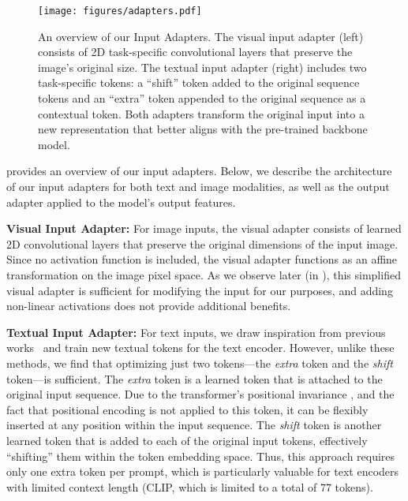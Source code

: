 \begin{figure}[t]
	\centering
	\texttt{[image: figures/adapters.pdf]}
	\caption{An overview of our Input Adapters. The visual input adapter (left) consists of 2D task-specific convolutional layers that preserve the image's original size. The textual input adapter (right) includes two task-specific tokens: a ``shift'' token added to the original sequence tokens and an ``extra'' token appended to the original sequence as a contextual token. Both adapters transform the original input into a new representation that better aligns with the pre-trained backbone model.}
	\label{fig:adapters}
\end{figure}

 provides an overview of our input adapters. Below, we describe the architecture of our input adapters for both text and image modalities, as well as the output adapter applied to the model's output features.

\textbf{Visual Input Adapter:} For image inputs, the visual adapter consists of learned 2D convolutional layers that preserve the original dimensions of the input image. Since no activation function is included, the visual adapter functions as an affine transformation on the image pixel space. As we observe later (in ), this simplified visual adapter is sufficient for modifying the input for our purposes, and adding non-linear activations does not provide additional benefits.

\textbf{Textual Input Adapter:} For text inputs, we draw inspiration from previous works~\citep{prefix_tunning,prompt_tunning,prompt_tunning2} and train new textual tokens for the text encoder. However, unlike these methods, we find that optimizing just two tokens—the \textit{extra} token and the \textit{shift} token—is sufficient. The \emph{extra} token is a learned token that is attached to the original input sequence. Due to the transformer's positional invariance \citep{vaswani2017attentionisallyouneed}, and the fact that positional encoding is not applied to this token, it can be flexibly inserted at any position within the input sequence. The \emph{shift} token is another learned token that is added to each of the original input tokens, effectively ``shifting'' them within the token embedding space.
Thus, this approach requires only one extra token per prompt, which is particularly valuable for text encoders with limited context length (\eg CLIP, which is limited to a total of 77 tokens). 

